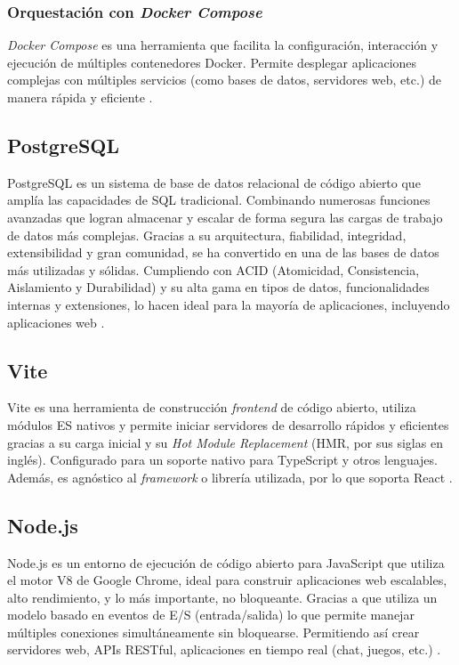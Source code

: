\subsubsection{Orquestación con \textit{Docker Compose}}
\textit{Docker Compose} es una herramienta que facilita la configuración, interacción y ejecución de múltiples contenedores
Docker. Permite desplegar aplicaciones complejas con múltiples servicios (como bases de datos, servidores web, etc.) de manera
rápida y eficiente \cite{aws2025docker}.

\subsection{PostgreSQL}
PostgreSQL es un sistema de base de datos relacional de código abierto que amplía las capacidades de SQL tradicional.
Combinando numerosas funciones avanzadas que logran almacenar y escalar de forma segura las cargas de trabajo de datos más
complejas. Gracias a su arquitectura, fiabilidad, integridad, extensibilidad y gran comunidad, se ha convertido en una de las
bases de datos más utilizadas y sólidas. Cumpliendo con ACID (Atomicidad, Consistencia, Aislamiento y Durabilidad) y su alta
gama en tipos de datos, funcionalidades internas y extensiones, lo hacen ideal para la mayoría de aplicaciones, incluyendo
aplicaciones web \cite{postgresql2026about}.

\subsection{Vite}
Vite es una herramienta de construcción \textit{frontend} de código abierto, utiliza módulos ES nativos y permite iniciar
servidores de desarrollo rápidos y eficientes gracias a su carga inicial y su \textit{Hot Module Replacement} 
(HMR, por sus siglas en inglés). Configurado para un soporte nativo para TypeScript y otros lenguajes. Además, es
agnóstico al \textit{framework} o librería utilizada, por lo que soporta React \cite{vite2025introduction}.

\subsection{Node.js}
Node.js es un entorno de ejecución de código abierto para JavaScript que utiliza el motor V8 de Google Chrome, ideal para
construir aplicaciones web escalables, alto rendimiento, y lo más importante, no bloqueante. Gracias a que utiliza un modelo
basado en eventos de E/S (entrada/salida) lo que permite manejar múltiples conexiones simultáneamente sin bloquearse. 
Permitiendo así crear servidores web, APIs RESTful, aplicaciones en tiempo real (chat, juegos, etc.) \cite{cantelon2014node}.

